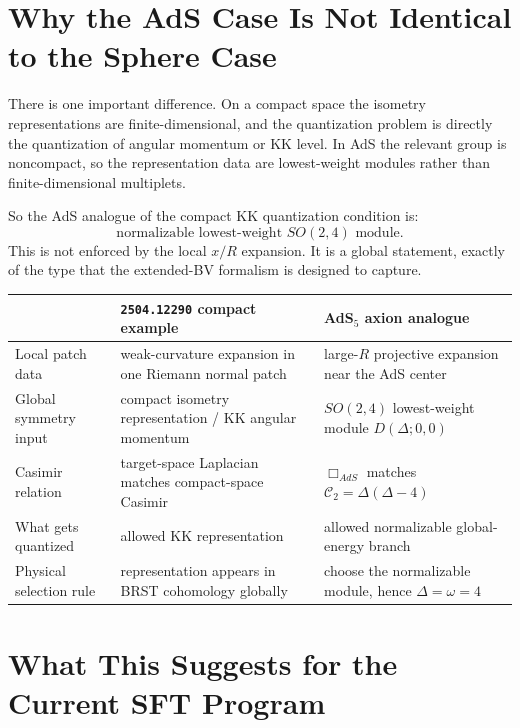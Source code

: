 \documentclass[12pt]{article}
\newcommand{\D}{\Delta}
\newcommand{\cC}{\mathcal{C}}
\begin{document}
\section{Why the AdS Case Is Not Identical to the Sphere Case}

There is one important difference.  On a compact space the isometry representations are finite-dimensional,
and the quantization problem is directly the quantization of angular momentum or KK level.  In AdS the
relevant group is noncompact, so the representation data are lowest-weight modules rather than
finite-dimensional multiplets.

So the AdS analogue of the compact KK quantization condition is:
\begin{equation}
\text{normalizable lowest-weight } SO(2,4)\text{ module}.
\end{equation}
This is not enforced by the local $x/R$ expansion.  It is a global statement, exactly of the type that
the extended-BV formalism is designed to capture.

\begin{center}
\begin{tabular}{>{\raggedright\arraybackslash}p{}>{\raggedright\arraybackslash}p{}>{\raggedright\arraybackslash}p{}}
\toprule
 & \texttt{2504.12290} compact example & AdS$_5$ axion analogue \\
\midrule
Local patch data &
weak-curvature expansion in one Riemann normal patch &
large-$R$ projective expansion near the AdS center \\
Global symmetry input &
compact isometry representation / KK angular momentum &
$SO(2,4)$ lowest-weight module $D(\D;0,0)$ \\
Casimir relation &
target-space Laplacian matches compact-space Casimir &
$\Box_{AdS}$ matches $\cC_2=\D(\D-4)$ \\
What gets quantized &
allowed KK representation &
allowed normalizable global-energy branch \\
Physical selection rule &
representation appears in BRST cohomology globally &
choose the normalizable module, hence $\D=\omega=4$ \\
\bottomrule
\end{tabular}
\end{center}

\section{What This Suggests for the Current SFT Program}
\end{document}
